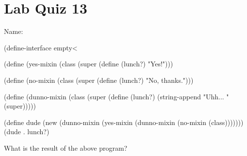 \documentclass{article}
\begin{document}
\section*{Lab Quiz 13}

\bigskip
\bigskip
Name: \underline{\hspace*{4in}}

\bigskip
\setlength{\parskip}{8pt}

\begin{schemedisplay}
  (define-interface empty<%

  (define (yes-mixin %
    (class
      (super %
      (define (lunch?)
        "Yes!")))

  (define (no-mixin %
    (class
      (super %
      (define (lunch?)
        "No, thanks.")))

  (define (dunno-mixin %
    (class
      (super %
      (define (lunch?)
        (string-append "Uhh... " (super)))))

  (define dude (new (dunno-mixin (yes-mixin (dunno-mixin (no-mixin (class)))))))
  (dude . lunch?)
\end{schemedisplay}

\bigskip
What is the result of the above program?
\end{document}
